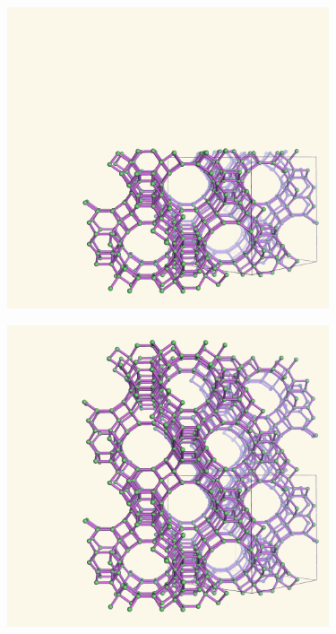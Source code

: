 \documentclass{beamer}
\begin{document}
\begin{frame}
  \begin{center}
    \includegraphics[height=3.5in]{fau-211}
  \end{center}
\end{frame}

\begin{frame}
  \begin{center}
    \includegraphics[height=3.5in]{fau-221}
  \end{center}
\end{frame}
\end{document}
